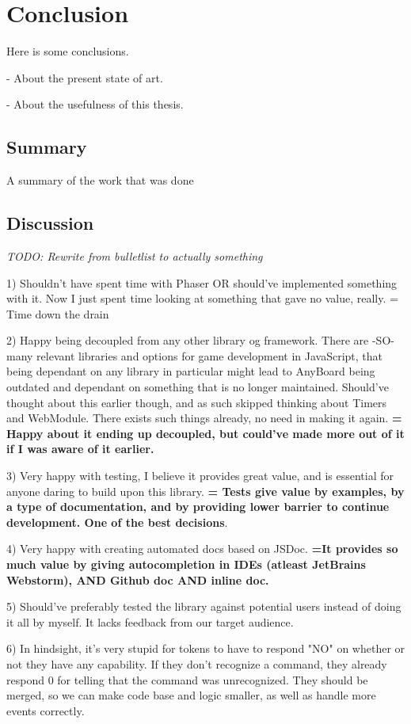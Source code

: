 \chapter{Conclusion} \label{ch:conclusion}
Here is some conclusions.

- About the present state of art.

- About the usefulness of this thesis.

\section{Summary}
A summary of the work that was done

\section{Discussion}
\label{se:discussion}
\emph{TODO: Rewrite from bulletlist to actually something}

1) Shouldn't have spent time with Phaser OR should've implemented something with it. Now I just spent time looking at something that gave no value, really. = Time down the drain

2) Happy being decoupled from any other library og framework. There are -SO- many relevant libraries and options for game development in JavaScript, that being dependant on any library in particular might lead to AnyBoard being outdated and dependant on something that is no longer maintained. Should've thought about this earlier though, and as such skipped thinking about Timers and WebModule. There exists such things already, no need in making it again. \textbf{= Happy about it ending up decoupled, but could've made more out of it if I was aware of it earlier.}

3) Very happy with testing, I believe it provides great value, and is essential for anyone daring to build upon this library. \textbf{= Tests give value by examples, by a type of documentation, and by providing lower barrier to continue development. One of the best decisions}. 

4) Very happy with creating automated docs based on JSDoc. \textbf{=It provides so much value by giving autocompletion in IDEs (atleast JetBrains Webstorm), AND Github doc AND inline doc.}

5) Should've preferably tested the library against potential users instead of doing it all by myself. It lacks feedback from our target audience.

6) In hindsight, it's very stupid for tokens to have to respond "NO" on whether or not they have any capability. If they don't recognize a command, they already respond 0 for telling that the command was unrecognized. They should be merged, so we can make code base and logic smaller, as well as handle more events correctly.

